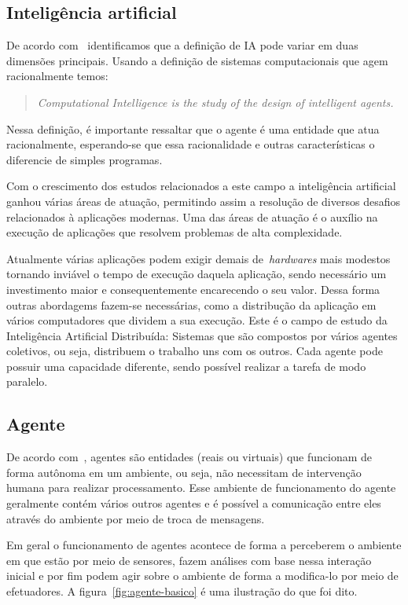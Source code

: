 \subsection{Inteligência artificial}

De acordo com~\cite{poole98} identificamos que a definição de IA pode variar em duas dimensões principais. Usando a definição de sistemas computacionais que agem racionalmente temos:

\begin{quote}
\emph{Computational Intelligence is the study of the design of intelligent agents.}
\end{quote}

Nessa definição, é importante ressaltar que o agente é uma entidade que atua racionalmente, esperando-se que essa racionalidade e outras características o diferencie de simples programas.

Com o crescimento dos estudos relacionados a este campo a inteligência artificial ganhou várias áreas de atuação, permitindo assim a resolução de diversos desafios relacionados à aplicações modernas. Uma das áreas de atuação é o auxílio na execução de aplicações que resolvem problemas de alta complexidade. 

Atualmente várias aplicações podem exigir demais de~\emph{hardwares} mais modestos tornando inviável o tempo de execução daquela aplicação, sendo necessário um investimento maior e consequentemente encarecendo o seu valor. Dessa forma outras abordagems fazem-se necessárias, como a distribução da aplicação em vários computadores que dividem a sua execução. Este é o campo de estudo da Inteligência Artificial Distribuída: Sistemas que são compostos por vários agentes coletivos, ou seja, distribuem o trabalho uns com os outros. Cada agente pode possuir uma capacidade diferente, sendo possível realizar a tarefa de modo paralelo. 

\subsection{Agente}

De acordo com~\cite{novig95}, agentes são entidades (reais ou virtuais) que funcionam de forma autônoma em um ambiente, ou seja, não necessitam de intervenção humana para realizar processamento. Esse ambiente de funcionamento do agente geralmente contém vários outros agentes e é possível a comunicação entre eles através do ambiente por meio de troca de mensagens.

Em geral o funcionamento de agentes acontece de forma a perceberem o ambiente em que estão por meio de sensores, fazem análises com base nessa interação inicial e por fim podem agir sobre o ambiente de forma a modifica-lo por meio de efetuadores. A figura~\ref{fig:agente-basico} é uma ilustração do que foi dito.

